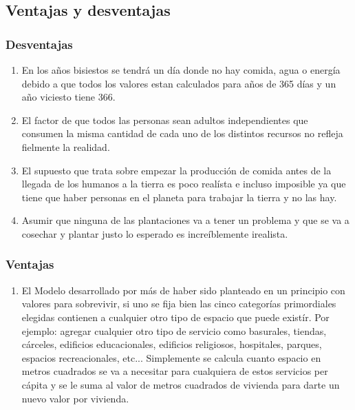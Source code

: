 \documentclass[12pt]{report}
\begin{document}
\subsection*{Ventajas y desventajas}
\subsubsection*{Desventajas}
\begin{enumerate}
    \item En los a\~nos bisiestos se tendr\'a un d\'ia donde no hay comida, agua o energ\'ia debido a que todos los valores estan calculados para a\~nos de 365 d\'ias y un a\~no viciesto tiene 366.
    \item El factor de que todos las personas sean adultos independientes que consumen la misma cantidad de cada uno de los distintos recursos no refleja fielmente la realidad. 
    \item El supuesto que trata sobre empezar la producci\'on de comida antes de la llegada de los humanos a la tierra es poco real\'ista e incluso imposible ya que tiene que haber personas en el planeta para trabajar la tierra y no las hay. 
    \item Asumir que ninguna de las plantaciones va a tener un problema y que se va a cosechar y plantar justo lo esperado es incre\'iblemente irealista. 
    
    \end{enumerate}

\subsubsection*{Ventajas}
\begin{enumerate}
    
    \item El Modelo desarrollado por m\'as de haber sido planteado en un principio con valores para sobrevivir, si uno se fija bien las cinco categor\'ias primordiales elegidas contienen a cualquier otro tipo de espacio que puede exist\'ir. Por ejemplo: agregar cualquier otro tipo de servicio como basurales, tiendas, c\'arceles, edificios educacionales, edificios religiosos, hospitales, parques, espacios recreacionales, etc... Simplemente se calcula cuanto espacio en metros cuadrados se va a necesitar para cualquiera de estos servicios per c\'apita y se le suma al valor de metros cuadrados de vivienda para darte un nuevo valor por vivienda. 
 
    

\end{enumerate}
\end{document}
